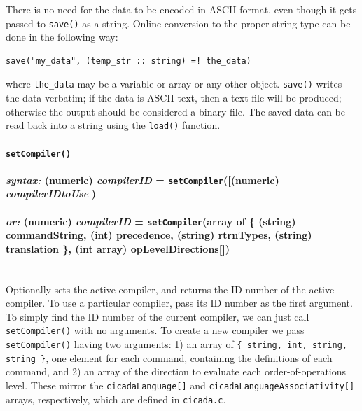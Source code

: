 \documentclass{article}
\newenvironment{code}{
       \begin{list}{}{
               \setlength{\leftmargin}{.4in}
               \setlength{\rightmargin}{0in}
               \setlength{\topsep}{.2in}
       }
       \small
       \item[] }
       { \end{list}   }
\begin{document}
There is no need for the data to be encoded in ASCII format, even though it gets passed to \verb#save()# as a string.  Online conversion to the proper string type can be done in the following way:

\begin{code} \begin{verbatim}
save("my_data", (temp_str :: string) =! the_data)
\end{verbatim} \end{code}

\noindent where \texttt{the\_data} may be a variable or array or any other object.  \texttt{save()} writes the data verbatim; if the data is ASCII text, then a text file will be produced; otherwise the output should be considered a binary file.  The saved data can be read back into a string using the \texttt{load()} function.\\

 





\paragraph{\texttt{setCompiler()}\\\\
\normalfont \emph{syntax: } (numeric) \emph{compilerID} = \texttt{setCompiler}([(numeric) \emph{compilerIDtoUse}])\\\\
\normalfont \emph{or: } (numeric) \emph{compilerID} = \texttt{setCompiler}(array of \{ (string) commandString, (int) precedence, (string) rtrnTypes, (string) translation \}, (int array) opLevelDirections[])\\\\}

Optionally sets the active compiler, and returns the ID number of the active compiler.  To use a particular compiler, pass its ID number as the first argument.  To simply find the ID number of the current compiler, we can just call \verb#setCompiler()# with no arguments.  To create a new compiler we pass \verb#setCompiler()# having two arguments:  1) an array of \verb#{ string, int, string, string }#, one element for each command, containing the definitions of each command, and 2) an array of the direction to evaluate each order-of-operations level.  These mirror the \verb#cicadaLanguage[]# and \verb#cicadaLanguageAssociativity[]# arrays, respectively, which are defined in \verb#cicada.c#.\\
\end{document}
